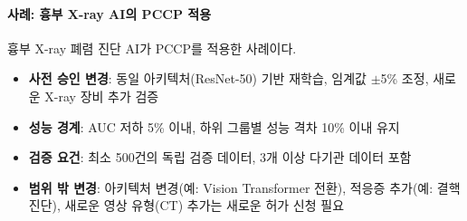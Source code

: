 \paragraph{사례: 흉부 X-ray AI의 PCCP 적용}
흉부 X-ray 폐렴 진단 AI가 PCCP를 적용한 사례이다.

\begin{itemize}
 \item \textbf{사전 승인 변경}: 동일 아키텍처(ResNet-50) 기반 재학습, 임계값 $\pm$5\% 조정, 새로운 X-ray 장비 추가 검증
 \item \textbf{성능 경계}: AUC 저하 5\% 이내, 하위 그룹별 성능 격차 10\% 이내 유지
 \item \textbf{검증 요건}: 최소 500건의 독립 검증 데이터, 3개 이상 다기관 데이터 포함
 \item \textbf{범위 밖 변경}: 아키텍처 변경(예: Vision Transformer 전환), 적응증 추가(예: 결핵 진단), 새로운 영상 유형(CT) 추가는 새로운 허가 신청 필요
\end{itemize}

